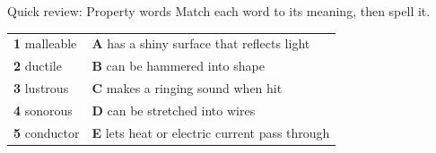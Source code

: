 \documentclass[aspectratio=169,11pt,xcolor=table]{beamer}
\begin{document}
\begin{frame}{Quick review: Property words}
\relax
Match each word to its meaning, then spell it.\par\vspace{2mm}
\begin{tabular}{@{}p{38mm}p{108mm}@{}}
\textbf{1} malleable & \textbf{A} has a shiny surface that reflects light\\
\textbf{2} ductile & \textbf{B} can be hammered into shape\\
\textbf{3} lustrous & \textbf{C} makes a ringing sound when hit\\
\textbf{4} sonorous & \textbf{D} can be stretched into wires\\
\textbf{5} conductor & \textbf{E} lets heat or electric current pass through\\
\end{tabular}
\end{frame}
\end{document}
